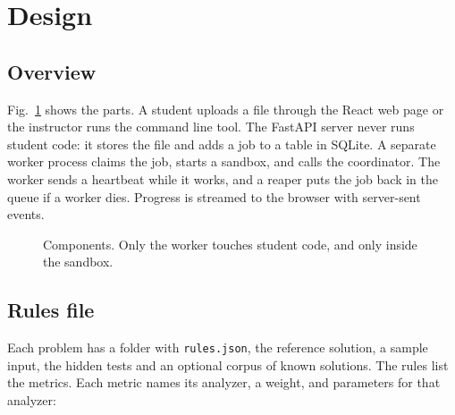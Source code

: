 \documentclass[conference]{IEEEtran}
\newcommand{\code}[1]{\texttt{#1}}
\begin{document}
\section{Design}\label{sec:design}

\subsection{Overview}
Fig.~\ref{fig:arch} shows the parts. A student uploads a file through the React web page or
the instructor runs the command line tool. The FastAPI server never runs student code: it
stores the file and adds a job to a table in SQLite. A separate worker process claims the job,
starts a sandbox, and calls the coordinator. The worker sends a heartbeat while it works, and
a reaper puts the job back in the queue if a worker dies. Progress is streamed to the browser
with server-sent events.

\begin{figure}[!t]
\centering
{}
\caption{Components. Only the worker touches student code, and only inside the sandbox.}
\label{fig:arch}
\end{figure}

\subsection{Rules file}
Each problem has a folder with \code{rules.json}, the reference solution, a sample input, the
hidden tests and an optional corpus of known solutions. The rules list the metrics. Each metric
names its analyzer, a weight, and parameters for that analyzer:
\end{document}
